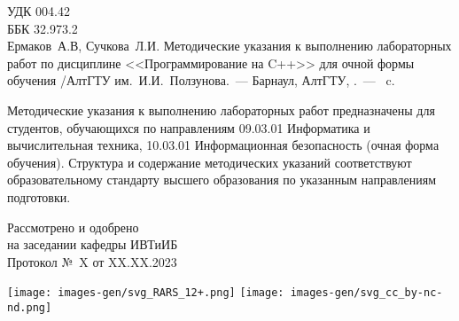 \documentclass[main.tex]{subfiles}
\begin{document}
\thispagestyle{empty}
\noindent
УДК 004.42\\
ББК 32.973.2\\

Ермаков~А.В, Сучкова~Л.И. Методические указания к выполнению лабораторных работ по дисциплине <<Программирование на C++>>  для очной формы обучения /АлтГТУ им.~И.И.~Ползунова.~--- Барнаул, АлтГТУ, \the\year.~--- \pageref{LastPage}~c.%

\vspace{24pt}

\begin{small}
    Методические указания к выполнению лабораторных работ предназначены для студентов, обучающихся по направлениям 09.03.01 Информатика и вычислительная техника, 10.03.01 Информационная безопасность (очная форма обучения).
    Структура и содержание методических указаний соответствуют образовательному стандарту высшего образования по указанным направлениям подготовки.
\end{small}

\vfill

\begin{flushright}
Рассмотрено и одобрено\\
на заседании кафедры ИВТиИБ\\
Протокол №~X от XX.XX.2023
\end{flushright}

\vspace{96pt}

\noindent
\texttt{[image: images-gen/svg\_RARS\_12+.png]}
\hfill
\texttt{[image: images-gen/svg\_cc\_by-nc-nd.png]}
\end{document}
